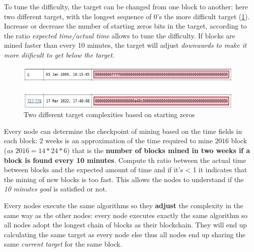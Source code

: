 \documentclass[10pt,a4paper]{report}
\begin{document}
To tune the difficulty, the target can be changed from one block to another: here two different target, with the longest sequence of 0's the more difficult target (\ref{zero-target}). Increase or decrease the number of starting zeros bits in the target, according to the ratio \textit{expected time/actual time} allows to tune the difficulty. If blocks are mined faster than every 10 minutes, the target will adjust \textit{downwards to make it more diificult to get below the target}.

\begin{figure}[h]
	\centering
	\includegraphics[scale=0.45]{images/Pasted image 20230405115136.png}
	\caption{Two different target complexities based on starting zeros}
	\label{zero-target}
\end{figure}


Every node can determine the checkpoint of mining based on the time fields in each block: 2 weeks is an approximation of the time required to mine $2016$ block (\textit{as $2016=14*24*6$}) that is the \textbf{number of blocks mined in two weeks if a block is found every 10 minutes}. Compute th ratio between the actual time between blocks and the expected amount of time and if it's < 1 it indicates that the mining of new blocks is too fast. This allows the nodes to understand if the \textit{10 minutes goal} is satisfied or not.

Every nodes execute the same algorithms so they \textbf{adjust} the complexity in the same way as the other nodes: every node executes exactly the same algorithm so all nodes adopt the longest chain of blocks as their blockchain. They will end up calculating the same target as every node else thus all nodes end up sharing the same \textit{current target} for the same block.
\end{document}
